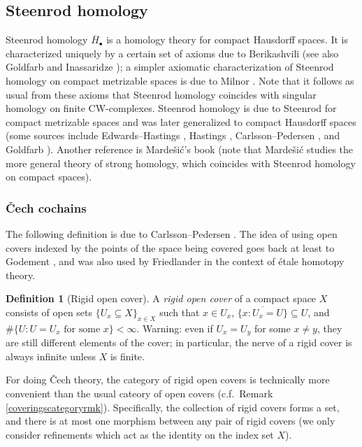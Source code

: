 \documentclass[12pt]{article}
\theoremstyle{definition}
\newtheorem{definition}[theorem]{Definition}
\theoremstyle{remark}
\numberwithin{equation}{subsection}
\newcommand{\sH}{\overline H}
\begin{document}
\subsection{Steenrod homology}\label{steenrodhomologysec}

Steenrod homology $\sH_\bullet$ is a homology theory for compact Hausdorff spaces.  It is characterized uniquely by a certain set of axioms due to Berikashvili \cite{berikashviliI,berikashviliII} (see also Goldfarb \cite[p355, \S7.4]{goldfarb} and Inassaridze \cite{inassaridze}); a simpler axiomatic characterization of Steenrod homology on compact metrizable spaces is due to Milnor \cite{milnor}.  Note that it follows as usual from these axioms that Steenrod homology coincides with singular homology on finite CW-complexes.  Steenrod homology is due to Steenrod for compact metrizable spaces \cite{steenrodreg} and was later generalized to compact Hausdorff spaces (some sources include Edwards--Hastings \cite{edwardshastings}, Hastings \cite{hastings}, Carlsson--Pedersen \cite{carlssonpedersen}, and Goldfarb \cite{goldfarb}).  Another reference is Marde\v si\'c's book \cite{mardesic} (note that Marde\v si\'c studies the more general theory of strong homology, which coincides with Steenrod homology on compact spaces).

\subsubsection{\v Cech cochains}

The following definition is due to Carlsson--Pedersen \cite{carlssonpedersen}.  The idea of using open covers indexed by the points of the space being covered goes back at least to Godement \cite[II \S 5.8]{godement}, and was also used by Friedlander \cite{friedlander} in the context of \'etale homotopy theory.

\begin{definition}[Rigid open cover]
A \emph{rigid open cover} of a compact space $X$ consists of open sets $\{U_x\subseteq X\}_{x\in X}$ such that $x\in U_x$, $\overline{\{x:U_x=U\}}\subseteq U$, and $\#\{U:U=U_x\text{ for some }x\}<\infty$.  Warning: even if $U_x=U_y$ for some $x\ne y$, they are still different elements of the cover; in particular, the nerve of a rigid cover is always infinite unless $X$ is finite.
\end{definition}

For doing \v Cech theory, the category of rigid open covers is technically more convenient than the usual cateory of open covers (c.f.\ Remark \ref{coveringscategoryrmk}).  Specifically, the collection of rigid covers forms a set, and there is at most one morphism between any pair of rigid covers (we only consider refinements which act as the identity on the index set $X$).
\end{document}
